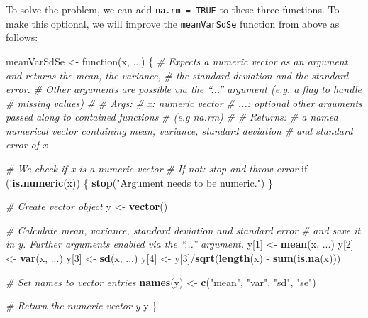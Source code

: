 \documentclass[11,]{article}
\newenvironment{Shaded}{\begin{snugshade}}{\end{snugshade}}
\newcommand{\KeywordTok}[1]{\textcolor[rgb]{0.13,0.29,0.53}{\textbf{{#1}}}}
\newcommand{\DecValTok}[1]{\textcolor[rgb]{0.00,0.00,0.81}{{#1}}}
\newcommand{\StringTok}[1]{\textcolor[rgb]{0.31,0.60,0.02}{{#1}}}
\newcommand{\CommentTok}[1]{\textcolor[rgb]{0.56,0.35,0.01}{\textit{{#1}}}}
\newcommand{\NormalTok}[1]{{#1}}
\begin{document}
To solve the problem, we can add \texttt{na.rm\ =\ TRUE} to these three
functions. To make this optional, we will improve the
\texttt{meanVarSdSe} function from above as follows:

\begin{Shaded}
\begin{Highlighting}[]
\NormalTok{meanVarSdSe <-}\StringTok{ }\NormalTok{function(x, ...) \{}
  \CommentTok{# Expects a numeric vector as an argument and returns the mean, the variance,}
  \CommentTok{# the standard deviation and the standard error. }
  \CommentTok{# Other arguments are possible via the “...” argument (e.g. a flag to handle}
  \CommentTok{# missing values)}
  \CommentTok{# }
  \CommentTok{# Args:}
  \CommentTok{#   x:    numeric vector}
  \CommentTok{#   ...:  optional other arguments passed along to contained functions}
  \CommentTok{#         (e.g na.rm)}
  \CommentTok{#}
  \CommentTok{# Returns:}
  \CommentTok{#   a named numerical vector containing mean, variance, standard deviation}
  \CommentTok{#   and standard error of x}
  
  \CommentTok{# We check if x is a numeric vector}
  \CommentTok{# If not: stop and throw error}
  \NormalTok{if (!}\KeywordTok{is.numeric}\NormalTok{(x)) \{}
    \KeywordTok{stop}\NormalTok{(}\StringTok{"Argument needs to be numeric."}\NormalTok{)}
  \NormalTok{\}}
  
  \CommentTok{# Create vector object}
  \NormalTok{y <-}\StringTok{ }\KeywordTok{vector}\NormalTok{()}
  
  \CommentTok{# Calculate mean, variance, standard deviation and standard error}
  \CommentTok{# and save it in y. Further arguments enabled via the “...” argument.}
  \NormalTok{y[}\DecValTok{1}\NormalTok{] <-}\StringTok{ }\KeywordTok{mean}\NormalTok{(x, ...)}
  \NormalTok{y[}\DecValTok{2}\NormalTok{] <-}\StringTok{ }\KeywordTok{var}\NormalTok{(x, ...)}
  \NormalTok{y[}\DecValTok{3}\NormalTok{] <-}\StringTok{ }\KeywordTok{sd}\NormalTok{(x, ...)}
  \NormalTok{y[}\DecValTok{4}\NormalTok{] <-}\StringTok{ }\NormalTok{y[}\DecValTok{3}\NormalTok{]/}\KeywordTok{sqrt}\NormalTok{(}\KeywordTok{length}\NormalTok{(x) -}\StringTok{ }\KeywordTok{sum}\NormalTok{(}\KeywordTok{is.na}\NormalTok{(x)))}
  
  \CommentTok{# Set names to vector entries}
  \KeywordTok{names}\NormalTok{(y) <-}\StringTok{ }\KeywordTok{c}\NormalTok{(}\StringTok{"mean"}\NormalTok{, }\StringTok{"var"}\NormalTok{, }\StringTok{"sd"}\NormalTok{, }\StringTok{"se"}\NormalTok{)}
  
  \CommentTok{# Return the numeric vector y}
  \NormalTok{y}
\NormalTok{\}}
\end{Highlighting}
\end{Shaded}
\end{document}
